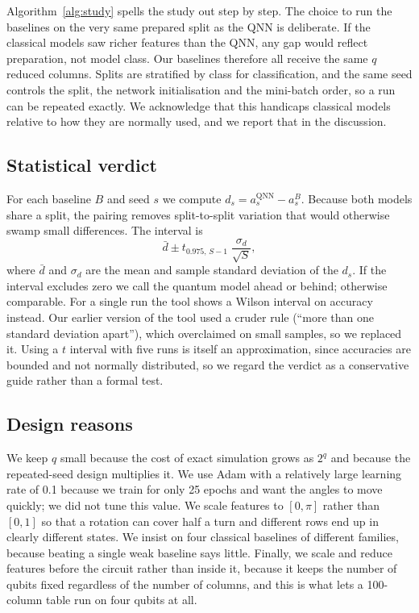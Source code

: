 \documentclass[12pt,onecolumn,draftclsnofoot]{IEEEtran}
\begin{document}
Algorithm~\ref{alg:study} spells the study out step by step. The choice to run the baselines on the very same prepared split as the QNN is deliberate. If the classical models saw richer features than the QNN, any gap would reflect preparation, not model class. Our baselines therefore all receive the same $q$ reduced columns. Splits are stratified by class for classification, and the same seed controls the split, the network initialisation and the mini-batch order, so a run can be repeated exactly. We acknowledge that this handicaps classical models relative to how they are normally used, and we report that in the discussion.

\subsection{Statistical verdict}
For each baseline $B$ and seed $s$ we compute $d_s=a_s^{\mathrm{QNN}}-a_s^{B}$. Because both models share a split, the pairing removes split-to-split variation that would otherwise swamp small differences. The interval is
\begin{equation}
  \bar d \pm t_{0.975,\,S-1}\;\frac{\sigma_d}{\sqrt{S}},
  \label{eq:paired}
\end{equation}
where $\bar d$ and $\sigma_d$ are the mean and sample standard deviation of the $d_s$. If the interval excludes zero we call the quantum model ahead or behind; otherwise comparable. For a single run the tool shows a Wilson interval on accuracy instead. Our earlier version of the tool used a cruder rule (``more than one standard deviation apart''), which overclaimed on small samples, so we replaced it. Using a $t$ interval with five runs is itself an approximation, since accuracies are bounded and not normally distributed, so we regard the verdict as a conservative guide rather than a formal test.

\subsection{Design reasons}
We keep $q$ small because the cost of exact simulation grows as $2^q$ and because the repeated-seed design multiplies it. We use Adam with a relatively large learning rate of 0.1 because we train for only 25 epochs and want the angles to move quickly; we did not tune this value. We scale features to $[0,\pi]$ rather than $[0,1]$ so that a rotation can cover half a turn and different rows end up in clearly different states. We insist on four classical baselines of different families, because beating a single weak baseline says little. Finally, we scale and reduce features before the circuit rather than inside it, because it keeps the number of qubits fixed regardless of the number of columns, and this is what lets a 100-column table run on four qubits at all.
\end{document}
